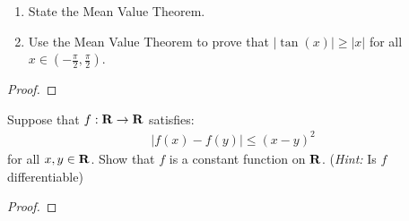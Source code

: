 \documentclass[11pt,twoside,openany]{memoir}
\begin{document}
\newpage
\fancyhead[L]{\scalebox{0.9}{Derivatives and the Mean Value Theorem}}
\fancyhead[R]{\scalebox{0.9}{Appeared on: F19}}
\begin{problem}
    \phantom{a}
    \begin{enumerate}[label = (\arabic*)]
        \item State the Mean Value Theorem.
        \item Use the Mean Value Theorem to prove that $|\tan(x)| \geq |x|$ for all $x \in \left(-\frac{\pi}{2},\frac{\pi}{2}\right)$.
    \end{enumerate}
\end{problem}
\begin{proof}
\end{proof}

\newpage
\fancyhead[L]{\scalebox{0.9}{Derivatives and the Mean Value Theorem}}
\fancyhead[R]{\scalebox{0.9}{Appeared on: W19}}
\begin{problem}
    Suppose that $f:\mathbf{R} \rightarrow \mathbf{R}$ satisfies:
        \begin{equation*}
        \begin{split}
            |f(x) - f(y)| \leq (x-y)^2
        \end{split}
        \end{equation*}
    for all $x,y \in \mathbf{R}$. Show that $f$ is a constant function on $\mathbf{R}$. (\textit{Hint:} Is $f$ differentiable)
\end{problem}
\begin{proof}
\end{proof}
\end{document}
